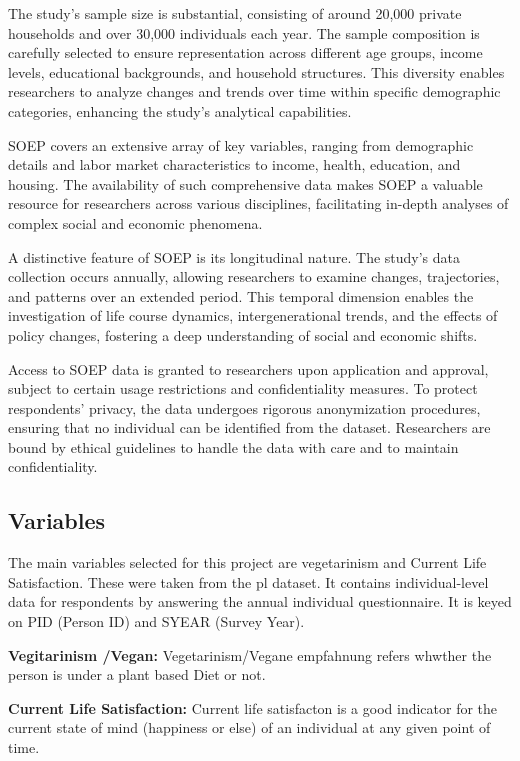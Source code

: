 \documentclass[
]{article}
\begin{document}
The study's sample size is substantial, consisting of around 20,000
private households and over 30,000 individuals each year. The sample
composition is carefully selected to ensure representation across
different age groups, income levels, educational backgrounds, and
household structures. This diversity enables researchers to analyze
changes and trends over time within specific demographic categories,
enhancing the study's analytical capabilities.

SOEP covers an extensive array of key variables, ranging from
demographic details and labor market characteristics to income, health,
education, and housing. The availability of such comprehensive data
makes SOEP a valuable resource for researchers across various
disciplines, facilitating in-depth analyses of complex social and
economic phenomena.

A distinctive feature of SOEP is its longitudinal nature. The study's
data collection occurs annually, allowing researchers to examine
changes, trajectories, and patterns over an extended period. This
temporal dimension enables the investigation of life course dynamics,
intergenerational trends, and the effects of policy changes, fostering a
deep understanding of social and economic shifts.

Access to SOEP data is granted to researchers upon application and
approval, subject to certain usage restrictions and confidentiality
measures. To protect respondents' privacy, the data undergoes rigorous
anonymization procedures, ensuring that no individual can be identified
from the dataset. Researchers are bound by ethical guidelines to handle
the data with care and to maintain confidentiality.

\subsection{Variables}\label{variables}

The main variables selected for this project are vegetarinism and
Current Life Satisfaction. These were taken from the pl dataset. It
contains individual-level data for respondents by answering the annual
individual questionnaire. It is keyed on PID (Person ID) and SYEAR
(Survey Year).

\textbf{Vegitarinism /Vegan:} Vegetarinism/Vegane empfahnung refers
whwther the person is under a plant based Diet or not.

\textbf{Current Life Satisfaction:} Current life satisfacton is a good
indicator for the current state of mind (happiness or else) of an
individual at any given point of time.
\end{document}
